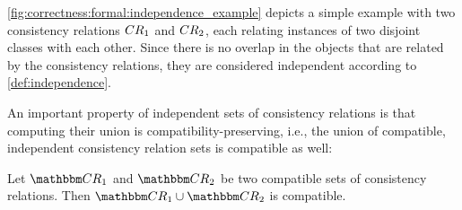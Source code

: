 \begin{example}
\autoref{fig:correctness:formal:independence_example} depicts a simple example with two consistency relations $CR_{1}$ and $CR_{2}$, each relating instances of two disjoint classes with each other.
Since there is no overlap in the objects that are related by the consistency relations, they are considered independent according to \autoref{def:independence}.
\end{example}

An important property of independent sets of consistency relations is that computing their union is compatibility-preserving, i.e., the union of compatible, independent consistency relation sets is compatible as well:

\begin{theorem} \label{theorem:independencecompatibility}
    Let $\consistencyrelationset{CR}_{1}$ and $\consistencyrelationset{CR}_{2}$ be two compatible sets of consistency relations. Then $\consistencyrelationset{CR}_{1} \cup \consistencyrelationset{CR}_{2}$ is compatible.
\end{theorem}

